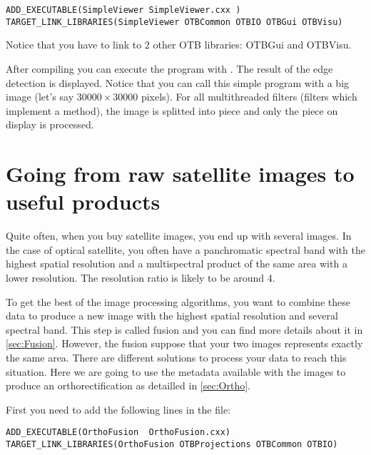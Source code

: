 \begin{small}
\begin{verbatim}
ADD_EXECUTABLE(SimpleViewer SimpleViewer.cxx )
TARGET_LINK_LIBRARIES(SimpleViewer OTBCommon OTBIO OTBGui OTBVisu)
\end{verbatim}
\end{small}

Notice that you have to link to 2 other OTB libraries: OTBGui and OTBVisu.



After compiling you can execute the program with . The result of the edge detection is displayed. Notice that you
can call this simple program with a big image (let's say $30000 \times 30000$
pixels). For all multithreaded filters (filters which implement a
 method), the image is splitted into piece and only
the piece on display is processed.

\section{Going from raw satellite images to useful products}

Quite often, when you buy satellite images, you end up with several images. In the case of optical satellite, you often have a panchromatic spectral band with the highest spatial resolution and a multispectral product of the same area with a lower resolution. The resolution ratio is likely to be around 4.

To get the best of the image processing algorithms, you want to combine these data to produce a new image with the highest spatial resolution and several spectral band. This step is called fusion and you can find more details about it in \ref{sec:Fusion}. However, the fusion suppose that your two images represents exactly the same area. There are different solutions to process your data to reach this situation. Here we are going to use the metadata available with the images to produce an orthorectification as detailled in \ref{sec:Ortho}.

First you need to add the following lines in the  file:

\begin{small}
\begin{verbatim}
ADD_EXECUTABLE(OrthoFusion  OrthoFusion.cxx)
TARGET_LINK_LIBRARIES(OrthoFusion OTBProjections OTBCommon OTBIO)
\end{verbatim}
\end{small}





% 
% 
% 



